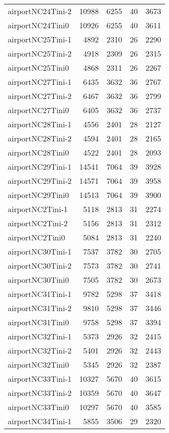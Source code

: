 \begin{longtable}{lrrrr}
airportNC24Tini-2 & 10988 & 6255 & 40 & 3673 \\
airportNC24Tini0 & 10926 & 6255 & 40 & 3611 \\
airportNC25Tini-1 & 4892 & 2310 & 26 & 2290 \\
airportNC25Tini-2 & 4918 & 2309 & 26 & 2315 \\
airportNC25Tini0 & 4868 & 2311 & 26 & 2267 \\
airportNC27Tini-1 & 6435 & 3632 & 36 & 2767 \\
airportNC27Tini-2 & 6467 & 3632 & 36 & 2799 \\
airportNC27Tini0 & 6405 & 3632 & 36 & 2737 \\
airportNC28Tini-1 & 4556 & 2401 & 28 & 2127 \\
airportNC28Tini-2 & 4594 & 2401 & 28 & 2165 \\
airportNC28Tini0 & 4522 & 2401 & 28 & 2093 \\
airportNC29Tini-1 & 14541 & 7064 & 39 & 3928 \\
airportNC29Tini-2 & 14571 & 7064 & 39 & 3958 \\
airportNC29Tini0 & 14513 & 7064 & 39 & 3900 \\
airportNC2Tini-1 & 5118 & 2813 & 31 & 2274 \\
airportNC2Tini-2 & 5156 & 2813 & 31 & 2312 \\
airportNC2Tini0 & 5084 & 2813 & 31 & 2240 \\
airportNC30Tini-1 & 7537 & 3782 & 30 & 2705 \\
airportNC30Tini-2 & 7573 & 3782 & 30 & 2741 \\
airportNC30Tini0 & 7505 & 3782 & 30 & 2673 \\
airportNC31Tini-1 & 9782 & 5298 & 37 & 3418 \\
airportNC31Tini-2 & 9810 & 5298 & 37 & 3446 \\
airportNC31Tini0 & 9758 & 5298 & 37 & 3394 \\
airportNC32Tini-1 & 5373 & 2926 & 32 & 2415 \\
airportNC32Tini-2 & 5401 & 2926 & 32 & 2443 \\
airportNC32Tini0 & 5345 & 2926 & 32 & 2387 \\
airportNC33Tini-1 & 10327 & 5670 & 40 & 3615 \\
airportNC33Tini-2 & 10359 & 5670 & 40 & 3647 \\
airportNC33Tini0 & 10297 & 5670 & 40 & 3585 \\
airportNC34Tini-1 & 5855 & 3506 & 29 & 2320 \\

\end{longtable}
